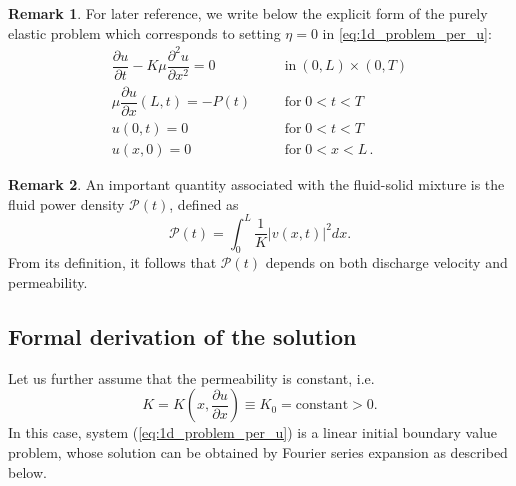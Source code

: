 \documentclass[12pt,a4paper]{amsart}
\theoremstyle{definition}
\newtheorem{remark}{Remark}
\begin{document}
\begin{remark}
For later reference, we write below the explicit form of the purely elastic problem which corresponds to setting $\eta =0$ in \eqref{eq:1d_problem_per_u}:
\begin{subequations}
\label{eq:1d_problem_per_u_eta =0}
\begin{align}
\dfrac{\partial u}{\partial t}-K\mu \dfrac{\partial ^{2}u}{\partial x^{2}}%
=0 &  & & %
\mbox{in}\ (0,L)\times (0,T) \label{eq:balance_for_u_eta =0} \\[3mm]
\mu \dfrac{\partial u}{\partial x}\left( L,t\right) =-P\left( t\right)
& & &
\mbox{for}\;0<t<T \label{eq:bc_x_L_eta =0} \\
u\left( 0,t\right) =0 & & & \mbox{for}\;0<t<T \label{eq:bc_x_0_eta =0} \\
u\left( x,0\right) =0 & & & \mbox{for}\;0<x<L\,. \label{eq:ic_eta =0}
\end{align}%
\end{subequations}
\end{remark}

\begin{remark}
An important quantity associated with the fluid-solid mixture is the fluid
power density $\mathcal{P}\left( t\right)$, defined as
\begin{equation}
\mathcal{P}\left( t\right) =\int_{0}^{L}\frac{1}{K}\left\vert v\left(
x,t\right) \right\vert ^{2}dx.  \label{power}
\end{equation}
From its definition, it follows that $\mathcal{P}\left( t\right)$ depends on both discharge velocity and permeability.
\end{remark}

\subsection{Formal derivation of the solution}
\label{sec:elast}

Let us further assume that the permeability is constant, i.e.
\begin{equation*}
K=K\left(x,\frac{\partial u}{\partial x}\right)\equiv K_{0}=\mathrm{constant}%
>0.
\end{equation*}%
In this case, system (\ref{eq:1d_problem_per_u}) is a linear
initial boundary value problem,
whose solution can be obtained by Fourier series expansion as described below.
\end{document}
